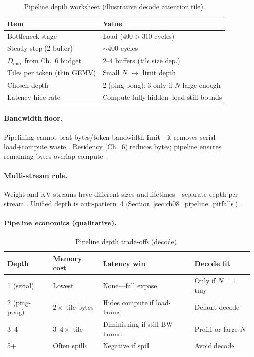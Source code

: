 \begin{table}[t]
\centering
\small
\caption{Pipeline depth worksheet (illustrative decode attention tile).}
\label{tab:ch08_depth_worked_example}
\begin{tabular}{@{}ll@{}}
\toprule
\textbf{Item} & \textbf{Value} \\
\midrule
Bottleneck stage & Load ($400 > 300$ cycles) \\
Steady step (2-buffer) & ${\sim}400$ cycles \\
$D_{\max}$ from Ch.~6 budget & 2--4 buffers (tile size dep.) \\
Tiles per token (thin GEMV) & Small $N$ $\rightarrow$ limit depth \\
Chosen depth & 2 (ping-pong); 3 only if $N$ large enough \\
Latency hide rate & Compute fully hidden; load still bounds \\
\bottomrule
\end{tabular}
\end{table}

\paragraph{Bandwidth floor.}
Pipelining cannot beat bytes/token bandwidth limit---it removes serial load+compute waste \citep{memoryfloor2026,taxbreak2026,patel2025llminference}.
Residency (Ch.~6) reduces bytes; pipeline ensures remaining bytes overlap compute \citep{dao2022flashattention,kwon2023vllm,yirage2026}.

\paragraph{Multi-stream rule.}
Weight and KV streams have different sizes and lifetimes---separate depth per stream \citep{kwon2023vllm,dao2023flashdecoding,shah2024flashattention3}.
Unified depth is anti-pattern~4 (Section~\ref{sec:ch08_pipeline_pitfalls}) \citep{yirage2026,patel2025llminference}.

\paragraph{Pipeline economics (qualitative).}
\begin{table}[t]
\centering
\small
\caption{Pipeline depth trade-offs (decode).}
\label{tab:ch08_pipeline_economics}
\begin{tabular}{@{}p{2.2cm}p{2.8cm}p{2.8cm}p{2.8cm}@{}}
\toprule
\textbf{Depth} & \textbf{Memory cost} & \textbf{Latency win} & \textbf{Decode fit} \\
\midrule
1 (serial) & Lowest & None---full expose & Only if $N{=}1$ tiny \\
2 (ping-pong) & $2\times$ tile bytes & Hides compute if load-bound & Default decode \\
3--4 & $3$--$4\times$ tile & Diminishing if still BW-bound & Prefill or large $N$ \\
5+ & Often spills & Negative if spill & Avoid decode \\
\bottomrule
\end{tabular}
\end{table}

